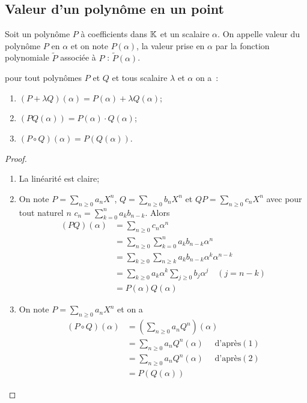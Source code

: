 \subsection{Valeur d'un polynôme en un point}

\begin{defdef}
  Soit un polynôme \(P\) à coefficients dans \(\mathbb{K}\) et un scalaire \(\alpha\). On appelle valeur du polynôme \(P\) en \(\alpha\) et on note \(P(\alpha)\), la valeur prise en \(\alpha\) par la fonction polynomiale \(\widetilde{P}\) associée à \(P\) : \(\widetilde{P}(\alpha)\).
\end{defdef}

\begin{prop}
  pour tout polynômes \(P\) et \(Q\) et tous scalaire \(\lambda\) et \(\alpha\) on a~:
  \begin{enumerate}
  \item \((P+\lambda Q)(\alpha)=P(\alpha) + \lambda Q(\alpha)\);
  \item \((PQ(\alpha))=P(\alpha) \cdot Q(\alpha)\);
  \item \((P \circ Q)(\alpha) = P(Q(\alpha))\).
  \end{enumerate}
\end{prop}
\begin{proof}
  \begin{enumerate}
  \item La linéarité est claire;
  \item On note \(P=\sum_{n \geqslant 0}a_n X^n\), \(Q=\sum_{n \geqslant 0}b_n X^n\) et \(QP=\sum_{n \geqslant 0}c_n X^n\) avec pour tout naturel \(n\) \(c_n = \sum_{k=0}^n a_kb_{n-k}\). Alors
    \begin{align}
      (PQ)(\alpha)&=\sum_{n \geqslant 0}c_n \alpha^n \\
      &=\sum_{n \geqslant 0} \sum_{k=0}^n a_k b_{n-k} \alpha^n\\
      &=\sum_{k \geqslant 0} \sum_{n \geqslant k} a_k b_{n-k} \alpha^k \alpha^{n-k}\\
      &=\sum_{k \geqslant 0}  a_k  \alpha^k \sum_{j \geqslant 0} b_j \alpha^j \quad (j=n-k)\\
      &=P(\alpha) Q(\alpha)
    \end{align}
  \item On note \(P=\sum_{n \geqslant 0}a_n X^n\) et on a
    \begin{align}
      (P \circ Q)(\alpha) &= \left(\sum_{n \geqslant 0} a_n Q^n \right)(\alpha)\\
      &= \sum_{n \geqslant 0} a_n Q^n(\alpha) \quad \text{~d'après} (1)\\
      &= \sum_{n \geqslant 0} a_n Q^n(\alpha) \quad \text{~d'après} (2)\\
      &= P(Q(\alpha))
    \end{align}
  \end{enumerate}
\end{proof}

